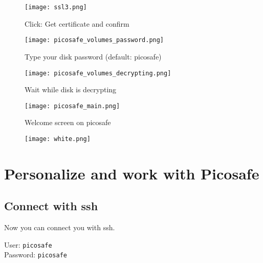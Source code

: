 \begin{wrapfigure}{r}{1.0\textwidth}
  \begin{center}
    \texttt{[image: ssl3.png]}
  \end{center}
  \caption{Click: Get certificate and confirm}
\end{wrapfigure}



\begin{wrapfigure}{r}{1.00\textwidth}
  \begin{center}
    \texttt{[image: picosafe\_volumes\_password.png]}
  \end{center}
  \caption{Type your disk password (default: picosafe)}
\end{wrapfigure}

\begin{wrapfigure}{r}{1.0\textwidth}
  \begin{center}
    \texttt{[image: picosafe\_volumes\_decrypting.png]}
  \end{center}
  \caption{Wait while disk is decrypting}
\end{wrapfigure}

\begin{wrapfigure}{r}{1.0\textwidth}
  \begin{center}
    \texttt{[image: picosafe\_main.png]}
  \end{center}
  \caption{Welcome screen on picosafe}
\end{wrapfigure}

\begin{wrapfigure}{r}{1.0\textwidth}
  \begin{center}
    \texttt{[image: white.png]}
  \end{center}
\end{wrapfigure}

\chapter{Personalize and work with Picosafe}

\section{Connect with ssh}

Now you can connect you with ssh.


User: \texttt{picosafe} \\
Password: \texttt{picosafe} \\

